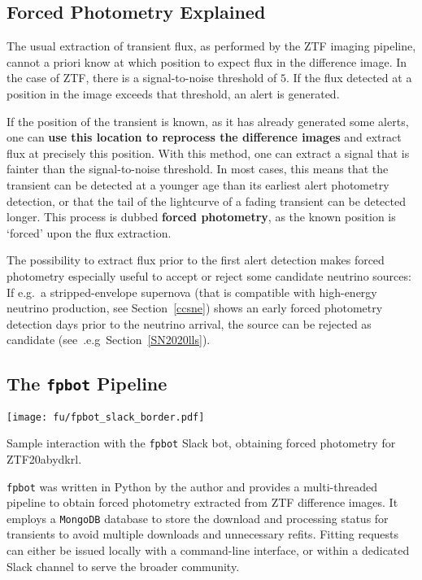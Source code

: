 \subsection{Forced Photometry Explained}
The usual extraction of transient flux, as performed by the ZTF imaging pipeline, cannot a priori know at which position to expect flux in the difference image. In the case of ZTF, there is a signal-to-noise threshold of $5$. If the flux detected at a position in the image exceeds that threshold, an alert is generated.

If the position of the transient is known, as it has already generated some alerts, one can \textbf{use this location to reprocess the difference images} and extract flux at precisely this position. With this method, one can extract a signal that is fainter than the signal-to-noise threshold. In most cases, this means that the transient can be detected at a younger age than its earliest alert photometry detection, or that the tail of the lightcurve of a fading transient can be detected longer. This process is dubbed \textbf{forced photometry}, as the known position is `forced' upon the flux extraction.

The possibility to extract flux prior to the first alert detection makes forced photometry especially useful to accept or reject some candidate neutrino sources: If e.g.\ a stripped-envelope supernova (that is compatible with high-energy neutrino production, see Section~\ref{ccsne}) shows an early forced photometry detection days prior to the neutrino arrival, the source can be rejected as candidate (see~.e.g\ Section~\ref{SN2020lls}).

\subsection{The \texttt{fpbot} Pipeline}
\begin{marginfigure}
    \texttt{[image: fu/fpbot\_slack\_border.pdf]}
    \caption[\texttt{fpbot} Slack bot interaction]{Sample interaction with the \texttt{fpbot} Slack bot, obtaining forced photometry for ZTF20abydkrl.}
\end{marginfigure}
\texttt{fpbot} was written in Python by the author and provides a multi-threaded pipeline to obtain forced photometry extracted from ZTF difference images. It employs a \texttt{MongoDB} database to store the download and processing status for transients to avoid multiple downloads and unnecessary refits. Fitting requests can either be issued locally with a command-line interface, or within a dedicated Slack channel to serve the broader community.

